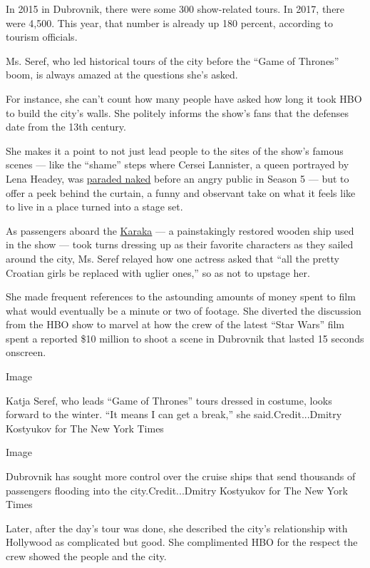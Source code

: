 In 2015 in Dubrovnik, there were some 300 show-related tours. In 2017,
there were 4,500. This year, that number is already up 180 percent,
according to tourism officials.

Ms. Seref, who led historical tours of the city before the ``Game of
Thrones'' boom, is always amazed at the questions she's asked.

For instance, she can't count how many people have asked how long it
took HBO to build the city's walls. She politely informs the show's fans
that the defenses date from the 13th century.

She makes it a point to not just lead people to the sites of the show's
famous scenes --- like the ``shame'' steps where Cersei Lannister, a
queen portrayed by Lena Headey, was
\href{https://artsbeat.blogs.nytimes3xbfgragh.onion/2015/06/14/game-of-thrones-season-5-finale-jon-snow/}{paraded
naked} before an angry public in Season 5 --- but to offer a peek behind
the curtain, a funny and observant take on what it feels like to live in
a place turned into a stage set.

As passengers aboard the
\href{http://karaka.info/excursions-dubrovnik/game-of-thrones/}{Karaka}
--- a painstakingly restored wooden ship used in the show --- took turns
dressing up as their favorite characters as they sailed around the city,
Ms. Seref relayed how one actress asked that ``all the pretty Croatian
girls be replaced with uglier ones,'' so as not to upstage her.

She made frequent references to the astounding amounts of money spent to
film what would eventually be a minute or two of footage. She diverted
the discussion from the HBO show to marvel at how the crew of the latest
``Star Wars'' film spent a reported \$10 million to shoot a scene in
Dubrovnik that lasted 15 seconds onscreen.

Image

Katja Seref, who leads ``Game of Thrones'' tours dressed in costume,
looks forward to the winter. ``It means I can get a break,'' she
said.Credit...Dmitry Kostyukov for The New York Times

Image

Dubrovnik has sought more control over the cruise ships that send
thousands of passengers flooding into the city.Credit...Dmitry Kostyukov
for The New York Times

Later, after the day's tour was done, she described the city's
relationship with Hollywood as complicated but good. She complimented
HBO for the respect the crew showed the people and the city.

